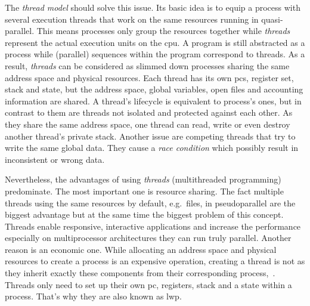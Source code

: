 The \textit{thread model} should solve this issue.
Its basic idea is to equip a process with several execution threads that work on the same resources running in quasi-parallel\cite{tanenbaum-modern-operating-systems}.
This means processes only group the resources together while \textit{threads} represent the actual execution units on the \ac{cpu}\cite{tanenbaum-modern-operating-systems}.
A program is still abstracted as a process while (parallel) sequences within the program correspond to threads.
As a result, \textit{threads} can be considered as slimmed down processes sharing the same address space and physical resources.
Each thread has its own \acp{pc}, register set, stack and state, but the address space, global variables, open files and accounting information are shared\cite{tanenbaum-modern-operating-systems}.
A thread's lifecycle is equivalent to process's ones, but in contrast to them are threads not isolated and protected against each other\cite{glatz2015betriebssysteme}.
As they share the same address space, one thread can read, write or even destroy another thread's private stack\cite{tanenbaum-modern-operating-systems}.
Another issue are competing threads that try to write the same global data.
They cause a \textit{race condition} which possibly result in inconsistent or wrong data\cite{brause2017betriebssysteme}.

Nevertheless, the advantages of using \textit{threads} (multithreaded programming) predominate.
The most important one is resource sharing. 
The fact multiple threads using the same resources by default, e.g.\ files, in pseudoparallel are the biggest advantage but at the same time the biggest problem of this concept.
Threads enable responsive, interactive applications and increase the performance especially on multiprocessor architectures they can run truly parallel\cite{silberschatz2009operating}.
Another reason is an economic one.
While allocating an address space and physical resources to create a process is an expensive operation, creating a thread is not as they inherit exactly these components from their corresponding process\cite{silberschatz2009operating},~\cite{mandl2014Grundkurs}.
Threads only need to set up their own \ac{pc}, registers, stack and a state within a process. 
That's why they are also known as \acf{lwp}\cite{mandl2014Grundkurs}.

